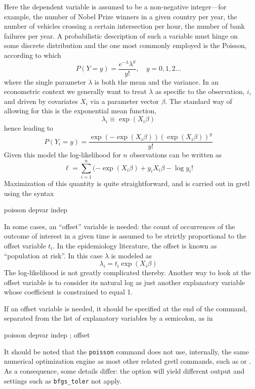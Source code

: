 Here the dependent variable is assumed to be a non-negative
integer---for example, the number of Nobel Prize winners in a given
country per year, the number of vehicles crossing a certain
intersection per hour, the number of bank failures per year. A
probabilistic description of such a variable must hinge on some
discrete distribution and the one most commonly employed is the
Poisson, according to which
\begin{equation}
P(Y = y) = \frac{e^{-\lambda}\lambda^y}{y!}, \quad y=0,1,2\dots
\end{equation}
where the single parameter $\lambda$ is both the mean and the
variance.  In an econometric context we generally want to treat
$\lambda$ as specific to the observation, $i$, and driven by
covariates $X_i$ via a parameter vector $\beta$. The standard way of
allowing for this is the exponential mean function,
\[
  \lambda_i \equiv \exp(X_i\beta)
\]
hence leading to
\begin{equation}
P(Y_i = y) = \frac{\exp(-\exp(X_i\beta))(\exp(X_i\beta))^y}{y!}
\end{equation}
Given this model the log-likelihood for $n$ observations can be
written as
\[
\ell = \sum_{i=1}^n (-\exp(X_i\beta) + y_iX_i\beta - \log y_i!
\]
Maximization of this quantity is quite straightforward, and is carried
out in gretl using the syntax
\begin{code}
  poisson depvar indep
\end{code}

In some cases, an ``offset'' variable is needed: the count of
occurrences of the outcome of interest in a given time is assumed to
be strictly proportional to the offset variable $t_i$. In the
epidemiology literature, the offset is known as ``population at
risk''. In this case $\lambda$ is modeled as
\[
  \lambda_i = t_i \exp(X_i\beta)
\]
The log-likelihood is not greatly complicated thereby.  Another way to
look at the offset variable is to consider its natural log as just
another explanatory variable whose coefficient is constrained to equal
1.

If an offset variable is needed, it should be specified at the end of
the command, separated from the list of explanatory variables by a
semicolon, as in
\begin{code}
  poisson depvar indep ; offset
\end{code}

It should be noted that the \texttt{poisson} command does not use,
internally, the same numerical optimization engine as most other
related gretl commands, such as  or . As a
consequence, some details differ: the  option will
yield different output and settings such as \texttt{bfgs\_toler}
not apply.

